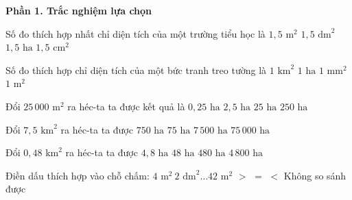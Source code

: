 \textbf{Phần 1. Trắc nghiệm lựa chọn}

\begin{ex} %
Số đo thích hợp nhất chỉ diện tích của một trường tiểu học là
\choice
{$1{,}5\text{ m}^2$}
{$1{,}5\text{ dm}^2$}
{\True $1{,}5\text{ ha}$}
{$1{,}5\text{ cm}^2$}
\end{ex}

\begin{ex} %
Số đo thích hợp chỉ diện tích của một bức tranh treo tường là
\choice
{$1\text{ km}^2$}
{$1\text{ ha}$}
{$1\text{ mm}^2$}
{\True $1\text{ m}^2$}
\end{ex}

\begin{ex} %
Đổi $25\,000\text{ m}^2$ ra héc-ta ta được kết quả là
\choice
{$0{,}25\text{ ha}$}
{\True $2{,}5\text{ ha}$}
{$25\text{ ha}$}
{$250\text{ ha}$}
\end{ex}

\begin{ex} %
Đổi $7{,}5\text{ km}^2$ ra héc-ta ta được
\choice
{\True $750\text{ ha}$}
{$75\text{ ha}$}
{$7\,500\text{ ha}$}
{$75\,000\text{ ha}$}
\end{ex}

\begin{ex} %
Đổi $0{,}48\text{ km}^2$ ra héc-ta ta được
\choice
{$4{,}8\text{ ha}$}
{\True $48\text{ ha}$}
{$480\text{ ha}$}
{$4\,800\text{ ha}$}
\end{ex}

\begin{ex} %
Điền dấu thích hợp vào chỗ chấm: $4\text{ m}^2\ 2\text{ dm}^2 \dots 42\text{ m}^2$
\choice
{$>$}
{$=$}
{\True $<$}
{Không so sánh được}
\end{ex}

